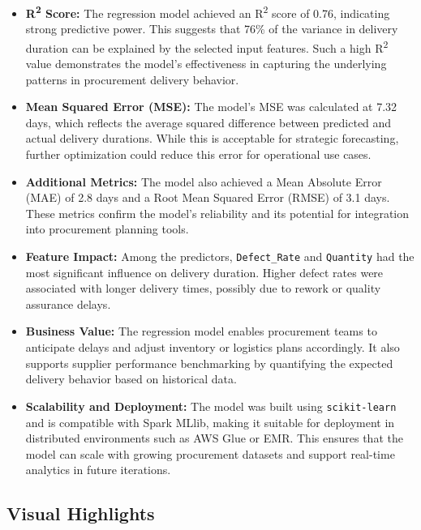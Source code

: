 \documentclass[10pt, twocolumn]{article}
\begin{document}
\begin{itemize}
    \item \textbf{R\textsuperscript{2} Score:} The regression model achieved an R\textsuperscript{2} score of 0.76, indicating strong predictive power. This suggests that 76\% of the variance in delivery duration can be explained by the selected input features. Such a high R\textsuperscript{2} value demonstrates the model’s effectiveness in capturing the underlying patterns in procurement delivery behavior.

    \item \textbf{Mean Squared Error (MSE):} The model’s MSE was calculated at 7.32 days, which reflects the average squared difference between predicted and actual delivery durations. While this is acceptable for strategic forecasting, further optimization could reduce this error for operational use cases.

    \item \textbf{Additional Metrics:} The model also achieved a Mean Absolute Error (MAE) of 2.8 days and a Root Mean Squared Error (RMSE) of 3.1 days. These metrics confirm the model’s reliability and its potential for integration into procurement planning tools.

    \item \textbf{Feature Impact:} Among the predictors, \texttt{Defect\_Rate} and \texttt{Quantity} had the most significant influence on delivery duration. Higher defect rates were associated with longer delivery times, possibly due to rework or quality assurance delays.

    \item \textbf{Business Value:} The regression model enables procurement teams to anticipate delays and adjust inventory or logistics plans accordingly. It also supports supplier performance benchmarking by quantifying the expected delivery behavior based on historical data.

    \item \textbf{Scalability and Deployment:} The model was built using \texttt{scikit-learn} and is compatible with Spark MLlib, making it suitable for deployment in distributed environments such as AWS Glue or EMR. This ensures that the model can scale with growing procurement datasets and support real-time analytics in future iterations.
\end{itemize}

\subsection{Visual Highlights}
\end{document}
